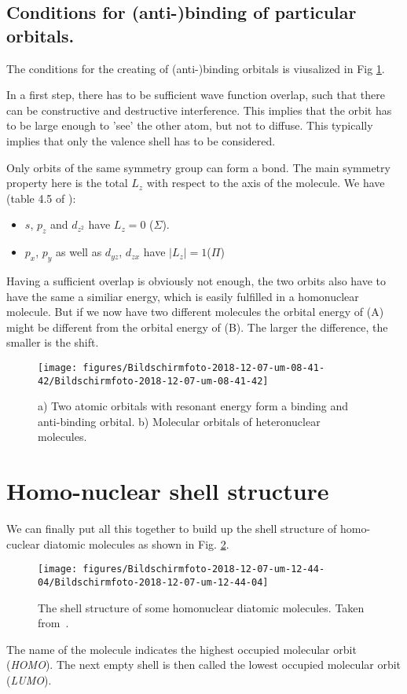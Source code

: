 \documentclass[10pt]{article}
\let\cite\citep
\providecommand\citep{\cite}
\begin{document}
\subsection{Conditions for (anti-)binding of particular orbitals.}
The conditions for the creating of (anti-)binding orbitals is viusalized in Fig  \ref{915399}.

In a first step, there has to be sufficient wave function overlap, such that there can be constructive and destructive interference. This implies that the orbit has to be large enough to 'see' the other atom, but not to diffuse. This typically implies that only the valence shell has to be considered.

Only orbits of the same symmetry group can form a bond. The main symmetry property here is the total $L_z$ with respect to the axis of the molecule. We have (table 4.5 of \cite{Demtr_der_2010}):
\begin{itemize}
\item $s$, $p_z$ and $d_{z^2}$ have $L_z = 0$ ($\Sigma$).
\item $p_x$, $p_y$ as well as $d_{yz}$, $d_{zx}$ have $|L_z| = 1$($\Pi$)
\end{itemize}
Having a sufficient overlap is obviously not enough, the two orbits also have to have the same a similiar energy, which is easily fulfilled in a homonuclear molecule. But if we now have two different molecules the orbital energy of (A) might be different from the orbital energy of (B). The larger the difference, the smaller is the shift.
\begin{figure}[h!]
\begin{center}
\texttt{[image: figures/Bildschirmfoto-2018-12-07-um-08-41-42/Bildschirmfoto-2018-12-07-um-08-41-42]}
\caption{{a) Two atomic orbitals with resonant energy form a binding and
anti-binding orbital. b) Molecular orbitals of heteronuclear molecules.
{\label{915399}}%
}}
\end{center}
\end{figure}

\section{Homo-nuclear shell structure}

We can finally put all this together to build up the shell structure of homo-cuclear diatomic molecules as shown in Fig.  \ref{128321}.
\begin{figure}[h!]
\begin{center}
\texttt{[image: figures/Bildschirmfoto-2018-12-07-um-12-44-04/Bildschirmfoto-2018-12-07-um-12-44-04]}
\caption{{The shell structure of some homonuclear diatomic molecules. Taken
from~\protect\cite{mechanics}.
{\label{128321}}%
}}
\end{center}
\end{figure}



The name of the molecule indicates the highest occupied molecular orbit (\textit{HOMO}). The next empty shell is then called the lowest occupied molecular orbit (\textit{LUMO}).

\FloatBarrier


\end{document}
